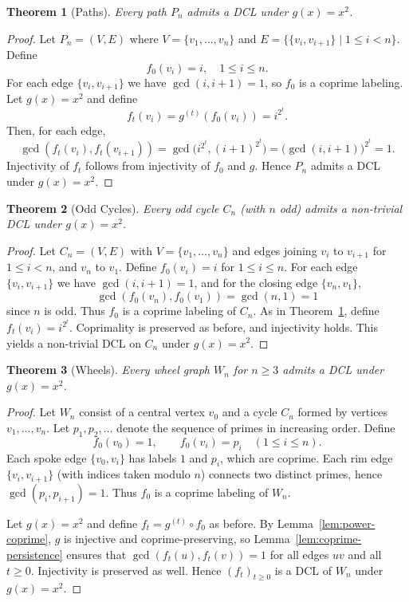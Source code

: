\documentclass[12pt]{amsart}
\theoremstyle{plain}
\newtheorem{thm}{Theorem}[section]
\theoremstyle{definition}
\theoremstyle{remark}
\numberwithin{equation}{section}
\begin{document}
\begin{thm}[Paths]\label{thm:paths}
Every path \(P_n\) admits a DCL under \(g(x)=x^2\).
\end{thm}

\begin{proof}
Let \(P_n=(V,E)\) where \(V=\{v_1,\dots,v_n\}\) and \(E=\{\{v_i,v_{i+1}\}\mid 1\le i<n\}\). Define
\[
f_0(v_i)=i,\quad 1\le i\le n.
\]
For each edge $\{v_i,v_{i+1}\}$ we have $\gcd(i,i+1)=1$, so $f_0$ is a coprime labeling. Let $g(x)=x^2$ and define
\[
f_t(v_i)=g^{(t)}(f_0(v_i)) = i^{2^t}.
\]
Then, for each edge,
\[
\gcd(f_t(v_i),f_t(v_{i+1}))
= \gcd\bigl(i^{2^t},(i+1)^{2^t}\bigr)
= \bigl(\gcd(i,i+1)\bigr)^{2^t}
= 1.
\]
Injectivity of $f_t$ follows from injectivity of $f_0$ and $g$. Hence $P_n$ admits a DCL under $g(x)=x^2$.
\end{proof}

\begin{thm}[Odd Cycles]\label{thm:odd-cycles}
Every odd cycle \(C_n\) (with $n$ odd) admits a non-trivial DCL under \(g(x)=x^2\).
\end{thm}

\begin{proof}
Let \(C_n=(V,E)\) with $V=\{v_1,\dots,v_n\}$ and edges joining $v_i$ to $v_{i+1}$ for $1\le i<n$, and $v_n$ to $v_1$. Define $f_0(v_i)=i$ for $1\le i\le n$. For each edge $\{v_i,v_{i+1}\}$ we have $\gcd(i,i+1)=1$, and for the closing edge $\{v_n,v_1\}$,
\[
\gcd(f_0(v_n),f_0(v_1))=\gcd(n,1)=1
\]
since $n$ is odd. Thus $f_0$ is a coprime labeling of $C_n$. As in Theorem~\ref{thm:paths}, define $f_t(v_i)=i^{2^t}$. Coprimality is preserved as before, and injectivity holds. This yields a non-trivial DCL on $C_n$ under $g(x)=x^2$.
\end{proof}

\begin{thm}[Wheels]\label{thm:wheels}
Every wheel graph \(W_n\) for \(n\ge3\) admits a DCL under \(g(x)=x^2\).
\end{thm}

\begin{proof}
Let $W_n$ consist of a central vertex $v_0$ and a cycle $C_n$ formed by vertices $v_1,\dots,v_n$. Let $p_1,p_2,\dots$ denote the sequence of primes in increasing order. Define
\[
f_0(v_0)=1,\qquad f_0(v_i)=p_i\quad (1\le i\le n).
\]
Each spoke edge $\{v_0,v_i\}$ has labels $1$ and $p_i$, which are coprime. Each rim edge $\{v_i,v_{i+1}\}$ (with indices taken modulo $n$) connects two distinct primes, hence $\gcd(p_i,p_{i+1})=1$. Thus $f_0$ is a coprime labeling of $W_n$.

Let $g(x)=x^2$ and define $f_t=g^{(t)}\circ f_0$ as before. By Lemma~\ref{lem:power-coprime}, $g$ is injective and coprime-preserving, so Lemma~\ref{lem:coprime-persistence} ensures that $\gcd(f_t(u),f_t(v))=1$ for all edges $uv$ and all $t\ge0$. Injectivity is preserved as well. Hence $(f_t)_{t\ge0}$ is a DCL of $W_n$ under $g(x)=x^2$.
\end{proof}
\end{document}
